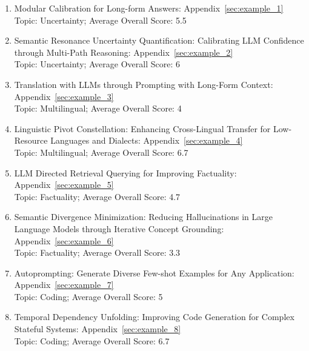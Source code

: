 \begin{enumerate}
    \item Modular Calibration for Long-form Answers: Appendix~\ref{sec:example_1} \\
    Topic: Uncertainty; Average Overall Score: 5.5
    
    \item Semantic Resonance Uncertainty Quantification: Calibrating LLM Confidence through Multi-Path Reasoning: Appendix~\ref{sec:example_2} \\
    Topic: Uncertainty; Average Overall Score: 6
    
    \item Translation with LLMs through Prompting with Long-Form Context: Appendix~\ref{sec:example_3} \\
    Topic: Multilingual; Average Overall Score: 4

    \item Linguistic Pivot Constellation: Enhancing Cross-Lingual Transfer for Low-Resource Languages and Dialects: Appendix~\ref{sec:example_4} \\
    Topic: Multilingual; Average Overall Score: 6.7

    \item LLM Directed Retrieval Querying for Improving Factuality: Appendix~\ref{sec:example_5} \\
    Topic: Factuality; Average Overall Score: 4.7 

    \item Semantic Divergence Minimization: Reducing Hallucinations in Large Language Models through Iterative Concept Grounding: Appendix~\ref{sec:example_6} \\
    Topic: Factuality; Average Overall Score: 3.3 

    \item Autoprompting: Generate Diverse Few-shot Examples for Any Application: Appendix~\ref{sec:example_7} \\
    Topic: Coding; Average Overall Score: 5 
    
    \item Temporal Dependency Unfolding: Improving Code Generation for Complex Stateful Systems: Appendix~\ref{sec:example_8} \\
    Topic: Coding; Average Overall Score: 6.7
\end{enumerate}
    

